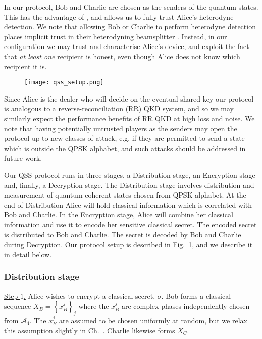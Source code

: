 In our protocol, Bob and Charlie are chosen as the senders of the quantum states. This has the advantage of , and allows us to fully trust Alice's heterodyne detection. We note that allowing Bob or Charlie to perform heterodyne detection places implicit trust in their heterodyning beamsplitter . Instead, in our configuration we may trust and characterise Alice's device, and exploit the fact that \emph{at least one} recipient is honest, even though Alice does not know which recipient it is.

\begin{figure}[htp]
\centering
\texttt{[image: qss\_setup.png]}
\caption{\label{fig:qss_setup}}
\end{figure}

Since Alice is the dealer who will decide on the eventual shared key our protocol is analogous to a reverse-reconciliation (RR) QKD system, and so we may similarly expect the performance benefits of RR QKD at high loss and noise. We note that having potentially untrusted players as the senders may open the protocol up to new classes of attack, e.g. if they are permitted to send a state which is outside the QPSK alphabet, and such attacks should be addressed in future work.


Our QSS protocol runs in three stages, a Distribution stage, an Encryption stage and, finally, a Decryption stage. The Distribution stage involves distribution and measurement of quantum coherent states chosen from QPSK alphabet. At the end of Distribution Alice will hold classical information which is correlated with Bob and Charlie. In the Encryption stage, Alice will combine her classical information and use it to encode her sensitive classical secret. The encoded secret is distributed to Bob and Charlie. The secret is decoded by Bob and Charlie during Decryption. Our protocol setup is described in Fig.~\ref{fig:qss_setup}, and we describe it in detail below.


\subsubsection*{Distribution stage}
\noindent \underline{Step $1$.} Alice wishes to encrypt a classical secret, $\sigma$. Bob forms a classical sequence $X_B = \left\{x_B^j\right\}_j$ where the $x_B^j$ are complex phases independently chosen from $\mathcal{A}_4$. The $x_B^j$ are assumed to be chosen uniformly at random, but we relax this assumption slightly in Ch.~. Charlie likewise forms $X_C$.

